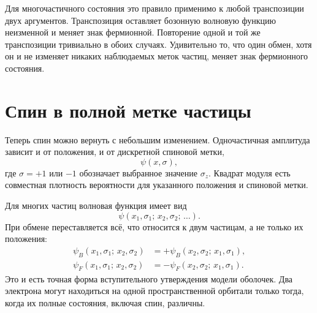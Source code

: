 Для многочастичного состояния это правило применимо к любой транспозиции двух аргументов. Транспозиция оставляет бозонную волновую функцию неизменной и меняет знак фермионной. Повторение одной и той же транспозиции тривиально в обоих случаях. Удивительно то, что один обмен, хотя он и не изменяет никаких наблюдаемых меток частиц, меняет знак фермионного состояния.

\section{Спин в полной метке частицы}

Теперь спин можно вернуть с небольшим изменением. Одночастичная амплитуда зависит и от положения, и от дискретной спиновой метки,
\begin{equation}
\psi(x,\sigma),
\end{equation}
где \(\sigma=+1\) или \(-1\) обозначает выбранное значение \(\sigma_z\). Квадрат модуля есть совместная плотность вероятности для указанного положения и спиновой метки.

Для многих частиц волновая функция имеет вид
\begin{equation}
\psi(x_1,\sigma_1;\,x_2,\sigma_2;\,\ldots).
\end{equation}
При обмене переставляется всё, что относится к двум частицам, а не только их положения:
\begin{align}
\psi_B(x_1,\sigma_1;\,x_2,\sigma_2)
&=
+\psi_B(x_2,\sigma_2;\,x_1,\sigma_1),\\
\psi_F(x_1,\sigma_1;\,x_2,\sigma_2)
&=
-\psi_F(x_2,\sigma_2;\,x_1,\sigma_1).
\end{align}
Это и есть точная форма вступительного утверждения модели оболочек. Два электрона могут находиться на одной пространственной орбитали только тогда, когда их полные состояния, включая спин, различны.

\begin{classroomqa}
\end{classroomqa}

\begin{classroomqa}
\end{classroomqa}

